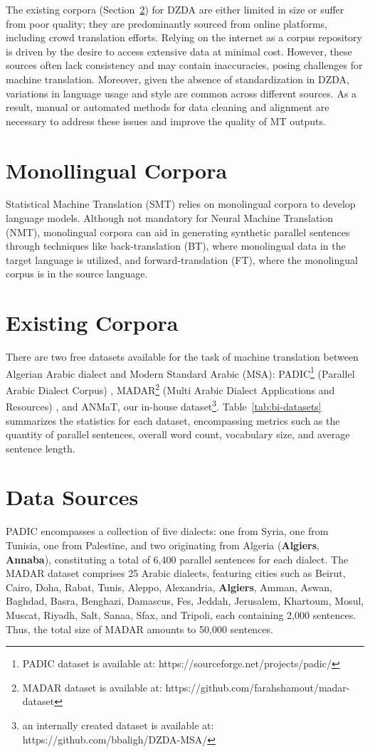 The existing corpora (Section~\ref{start5.2}) for DZDA are either limited in size or suffer from poor quality; they are predominantly sourced from online platforms, including crowd translation efforts. 
Relying on the internet as a corpus repository is driven by the desire to access extensive data at minimal cost. 
However, these sources often lack consistency and may contain inaccuracies, posing challenges for machine translation. 
Moreover, given the absence of standardization in DZDA, variations in language usage and style are common across different sources. 
As a result, manual or automated methods for data cleaning and alignment are necessary to address these issues and improve the quality of MT outputs.

\section{Monollingual Corpora}
Statistical Machine Translation (SMT) relies on monolingual corpora to develop language models. 
Although not mandatory for Neural Machine Translation (NMT), monolingual corpora can aid in generating synthetic parallel sentences through techniques like back-translation (BT), where monolingual data in the target language is utilized, and forward-translation (FT), where the monolingual corpus is in the source language.

\section{Existing Corpora}\label{start5.2}
There are two free datasets available for the task of machine translation between Algerian Arabic dialect and Modern Standard Arabic (MSA): PADIC\footnote{PADIC dataset is available at: https://sourceforge.net/projects/padic/} (Parallel Arabic Dialect Corpus) \cite{meftouh15}, MADAR\footnote{MADAR dataset is available at: https://github.com/farahshamout/madar-dataset} (Multi Arabic Dialect Applications and Resources) \cite{bouamor18}, and ANMaT, our in-house dataset\footnote{an internally created dataset is available at: https://github.com/bbaligh/DZDA-MSA/}.
Table~\ref{tab:bi-datasets} summarizes the statistics for each dataset, encompassing metrics such as the quantity of parallel sentences, overall word count, vocabulary size, and average sentence length.

\section{Data Sources}
PADIC encompasses a collection of five dialects: one from Syria, one from Tunisia, one from Palestine, and two originating from Algeria (\textbf{Algiers}, \textbf{Annaba}), constituting a total of 6,400 parallel sentences for each dialect.
The MADAR dataset comprises 25 Arabic dialects, featuring cities such as Beirut, Cairo, Doha, Rabat, Tunis, Aleppo, Alexandria, \textbf{Algiers}, Amman, Aswan, Baghdad, Basra, Benghazi, Damascus, Fes, Jeddah, Jerusalem, Khartoum, Mosul, Muscat, Riyadh, Salt, Sanaa, Sfax, and Tripoli, each containing 2,000 sentences. 
Thus, the total size of MADAR amounts to 50,000 sentences.

